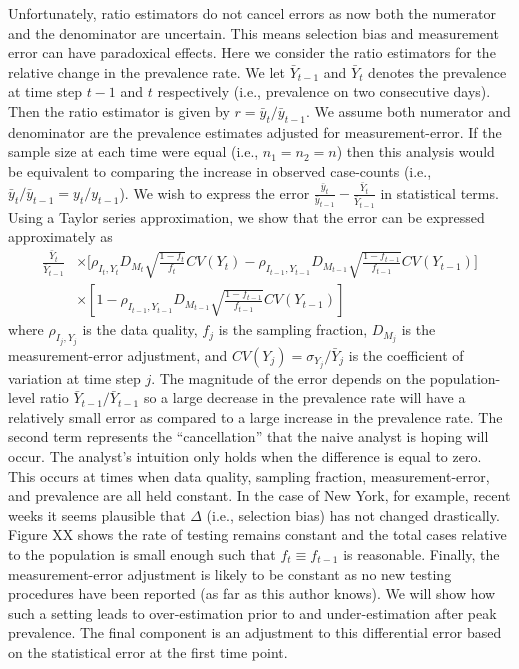 \documentclass[aoas]{amsart}
\begin{document}
Unfortunately, ratio estimators do not cancel errors as now both the numerator and the denominator are uncertain.  This means selection bias and measurement error can have paradoxical effects.  Here we consider the ratio estimators for the relative change in the prevalence rate.  We let $\bar Y_{t-1}$ and $\bar Y_{t}$ denotes the prevalence at time step $t-1$ and $t$ respectively (i.e., prevalence on two consecutive days).  Then the ratio estimator is given by $r = \bar y_t / \bar y_{t-1}$.  We assume both numerator and denominator are the prevalence estimates adjusted for measurement-error. If the sample size at each time were equal (i.e., $n_1 = n_2 = n$) then this analysis would be equivalent to comparing the increase in observed case-counts (i.e., $\bar y_t/\bar y_{t-1} = y_t/y_{t-1}$).  We wish to express the error $\frac{\bar y_t}{\bar y_{t-1}} - \frac{\bar Y_{t}}{\bar Y_{t-1}}$ in statistical terms.  Using a Taylor series approximation, we show that the error can be expressed approximately as
$$
\begin{aligned}
\frac{\bar Y_t}{\bar Y_{t-1}} &\times \bigg[ \rho_{I_t,Y_t} D_{M_t} \sqrt{\frac{1-f_t}{f_t}} CV (Y_t)  -\rho_{I_{t-1},Y_{t-1}} D_{M_{t-1}} \sqrt{\frac{1-f_{t-1}}{f_{t-1}}} CV (Y_{t-1}) \bigg] \\
&\times \left[ 1 - \rho_{I_{t-1},Y_{t-1}} D_{M_{t-1}} \sqrt{\frac{1-f_{t-1}}{f_{t-1}}} CV (Y_{t-1}) \right]
\end{aligned}
$$
where $\rho_{I_j, Y_j}$ is the data quality, $f_j$ is the sampling fraction, $D_{M_j}$ is the measurement-error adjustment, and $CV(Y_j) = \sigma_{Y_j}/\bar Y_j$ is the coefficient of variation at time step $j$.  The magnitude of the error depends on the population-level ratio $\bar Y_{t-1} / \bar Y_{t-1}$ so a large decrease in the prevalence rate will have a relatively small error as compared to a large increase in the prevalence rate. The second term represents the ``cancellation'' that the naive analyst is hoping will occur.  The analyst's intuition only holds when the difference is equal to zero.  This occurs at times when data quality, sampling fraction, measurement-error, and prevalence are all held constant.  In the case of New York, for example, recent weeks it seems plausible that $\Delta$ (i.e., selection bias) has not changed drastically.  Figure XX shows the rate of testing remains constant and the total cases relative to the population is small enough such that $f_t \equiv f_{t-1}$ is reasonable. Finally, the measurement-error adjustment is likely to be constant as no new testing procedures have been reported (as far as this author knows).  We will show how such a setting leads to over-estimation prior to and under-estimation after peak prevalence.  The final component is an adjustment to this differential error based on the statistical error at the first time point.
\end{document}
